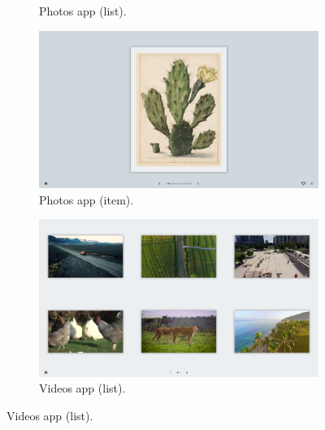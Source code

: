 \begin{figure}[ht]
\begin{subfigure}{.32\textwidth}
            \vspace{-5pt}
            \captionsetup{width=.9\linewidth}
            \caption{Photos app (list).}
            \label{fig:lui:screenshots:photos-list}
        \end{subfigure}
        
        \begin{subfigure}{.32\textwidth}
            \centering
            \includegraphics[width=.96\linewidth]{Figures/LUI/UI/photos-fullscreen.pdf}  
            \vspace{-5pt}
            \captionsetup{width=.9\linewidth}
            \caption{Photos app (item).}
            \label{fig:lui:screenshots:photos-fullscreen}
        \end{subfigure}
        \begin{subfigure}{.32\textwidth}
            \centering
            \includegraphics[width=.96\linewidth]{Figures/LUI/UI/videos-list.pdf} 
            \vspace{-5pt}
            \captionsetup{width=.9\linewidth}
            \caption{Videos app (list).}
            \label{fig:lui:screenshots:videos-list}
        \end{subfigure}

\end{figure}
